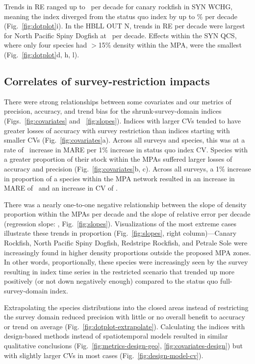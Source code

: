 \documentclass[12pt]{article}
\begin{document}
Trends in RE ranged up to \canaryrockfishSYNWCHGslopere\ per decade for canary rockfish in SYN WCHG, meaning the index diverged from the status quo index by up to \canaryrockfishSYNWCHGsloperePerc\% per decade (Fig.~\ref{fig:dotplot}i).
In the HBLL OUT N, trends in RE per decade were largest for North Pacific Spiny Dogfish at \northpacificspinydogfishSYNWCHGslopere\ per decade.
Effects within the SYN QCS, where only four species had $>$15\% density within the MPA, were the smallest (Fig.~\ref{fig:dotplot}d, h, l).

\subsection*{Correlates of survey-restriction impacts}

There were strong relationships between some covariates and our metrics of precision, accuracy, and trend bias for the shrunk-survey-domain indices (Figs.~\ref{fig:covariates} and ~\ref{fig:slopes}).
Indices with larger CVs tended to have greater losses of accuracy with survey restriction than indices starting with smaller CVs (Fig.~\ref{fig:covariates}a).
Across all surveys and species, this was at a rate of \covCvmaregeostat\ increase in MARE per 1\% increase in status quo index CV.
Species with a greater proportion of their stock within the MPAs suffered larger losses of accuracy and precision (Fig.~\ref{fig:covariates}b, c).
Across all surveys, a 1\% increase in proportion of a species within the MPA network resulted in an increase in MARE of \covMareGeo\ and an increase in CV of \covPrecisionGeo.

There was a nearly one-to-one negative relationship between the slope of density proportion within the MPAs per decade and the slope of relative error per decade (regression slope: \REslopeRegress, Fig.~\ref{fig:slopes}).
Visualizations of the most extreme cases illustrate these trends in proportion (Fig.~\ref{fig:slopes}, right column)---Canary Rockfish, North Pacific Spiny Dogfish, Redstripe Rockfish, and Petrale Sole were increasingly found in higher density proportions outside the proposed MPA zones.
In other words, proportionally, these species were increasingly seen by the survey resulting in index time series in the restricted scenario that trended up more positively (or not down negatively enough) compared to the status quo full-survey-domain index.

Extrapolating the species distributions into the closed areas instead of restricting the survey domain reduced precision with little or no overall benefit to accuracy or trend on average (Fig.~\ref{fig:dotplot-extrapolate}).
Calculating the indices with design-based methods instead of spatiotemporal models resulted in similar qualitative conclusions (Fig.~\ref{fig:metrics-design-geo}, \ref{fig:covariates-design}) but with slightly larger CVs in most cases (Fig.~\ref{fig:design-model-cv}).
\end{document}
